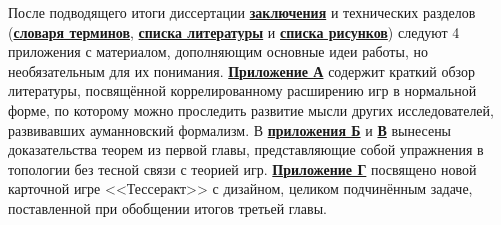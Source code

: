 

%

После подводящего итоги диссертации \underline{\textbf{заключения}} и технических разделов (\underline{\textbf{словаря терминов}}, \underline{\textbf{списка литературы}} и \underline{\textbf{списка рисунков}}) следуют 4 приложения с материалом, дополняющим основные идеи работы, но необязательным для их понимания. \underline{\textbf{Приложение А}} содержит краткий обзор литературы, посвящённой коррелированному расширению игр в нормальной форме, по которому можно проследить развитие мысли других исследователей, развивавших ауманновский формализм. В \underline{\textbf{приложения Б}} и \underline{\textbf{В}} вынесены доказательства теорем из первой главы, представляющие собой упражнения в топологии без тесной связи с теорией игр. \underline{\textbf{Приложение Г}} посвящено новой карточной игре <<Тессеракт>> с дизайном, целиком подчинённым задаче, поставленной при обобщении итогов третьей главы.

